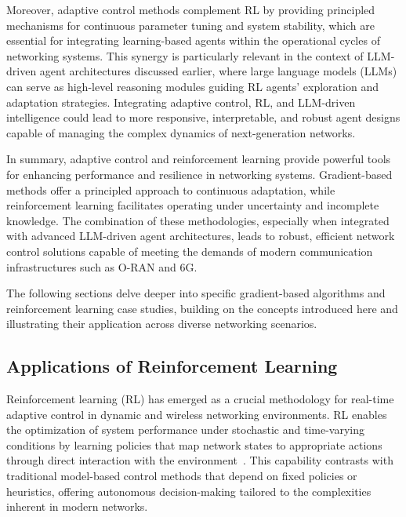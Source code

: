 \documentclass[sigconf]{acmart}
\begin{document}
Moreover, adaptive control methods complement RL by providing principled mechanisms for continuous parameter tuning and system stability, which are essential for integrating learning-based agents within the operational cycles of networking systems. This synergy is particularly relevant in the context of LLM-driven agent architectures discussed earlier, where large language models (LLMs) can serve as high-level reasoning modules guiding RL agents' exploration and adaptation strategies. Integrating adaptive control, RL, and LLM-driven intelligence could lead to more responsive, interpretable, and robust agent designs capable of managing the complex dynamics of next-generation networks.

In summary, adaptive control and reinforcement learning provide powerful tools for enhancing performance and resilience in networking systems. Gradient-based methods offer a principled approach to continuous adaptation, while reinforcement learning facilitates operating under uncertainty and incomplete knowledge. The combination of these methodologies, especially when integrated with advanced LLM-driven agent architectures, leads to robust, efficient network control solutions capable of meeting the demands of modern communication infrastructures such as O-RAN and 6G.

The following sections delve deeper into specific gradient-based algorithms and reinforcement learning case studies, building on the concepts introduced here and illustrating their application across diverse networking scenarios.


\subsection{Applications of Reinforcement Learning}

Reinforcement learning (RL) has emerged as a crucial methodology for real-time adaptive control in dynamic and wireless networking environments. RL enables the optimization of system performance under stochastic and time-varying conditions by learning policies that map network states to appropriate actions through direct interaction with the environment~\cite{ref2,ref5,ref7,ref12,ref31,ref32,ref33,ref34,ref35,ref50}. This capability contrasts with traditional model-based control methods that depend on fixed policies or heuristics, offering autonomous decision-making tailored to the complexities inherent in modern networks.
\end{document}
